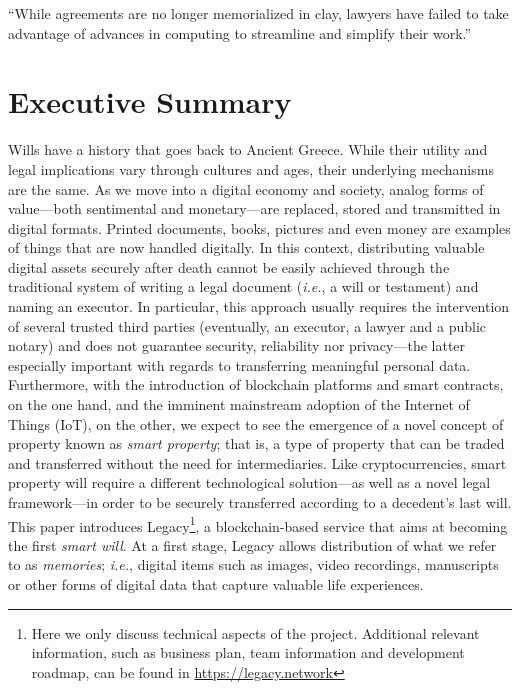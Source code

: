 \begin{savequote}[0.55\linewidth]
	``While agreements are no longer memorialized in clay, lawyers have failed to take advantage of advances in computing to streamline and simplify their work.''
\end{savequote}

\chapter{Executive Summary} %
\label{cha:executive_summary}

Wills have a history that goes back to Ancient Greece. While their utility and legal implications vary through cultures and ages, their underlying mechanisms are the same. As we move into a digital economy and society, analog forms of value---both sentimental and monetary---are replaced, stored and transmitted in digital formats. Printed documents, books, pictures and even money are examples of things that are now handled digitally. In this context, distributing valuable digital assets securely after death cannot be easily achieved through the traditional system of writing a legal document (\textit{i.e.}, a will or testament) and naming an executor. In particular, this approach usually requires the intervention of several trusted third parties (eventually, an executor, a lawyer and a public notary) and does not guarantee security, reliability nor privacy---the latter especially important with regards to transferring meaningful personal data. Furthermore, with the introduction of blockchain platforms and smart contracts, on the one hand, and the imminent mainstream adoption of the Internet of Things (IoT), on the other, we expect to see the emergence of a novel concept of property known as \textit{smart property}; that is, a type of property that can be traded and transferred without the need for intermediaries. Like cryptocurrencies, smart property will require a different technological solution---as well as a novel legal framework---in order to be securely transferred according to a decedent's last will.
This paper introduces Legacy\footnote{Here we only discuss technical aspects of the project. Additional relevant information, such as business plan, team information and development roadmap, can be found in \url{https://legacy.network}}, a blockchain-based service that aims at becoming the first \textit{smart will}. At a first stage, Legacy allows distribution of what we refer to as \textit{memories}; \textit{i.e.}, digital items such as images, video recordings, manuscripts or other forms of digital data that capture valuable life experiences.
